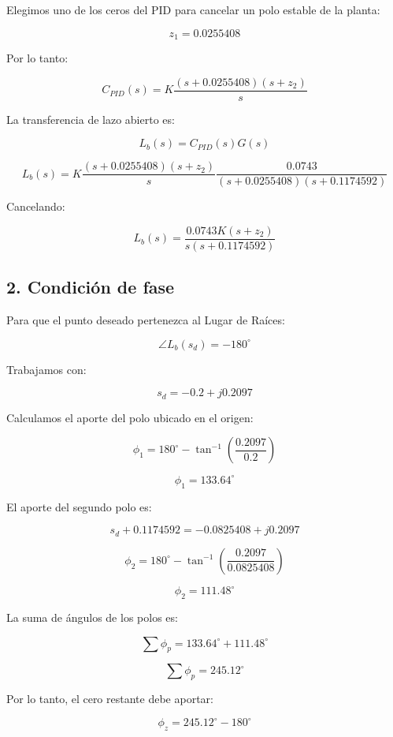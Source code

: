 \documentclass[10pt]{article}
\begin{document}
Elegimos uno de los ceros del PID para
cancelar un polo estable de la planta:

\[
z_1=0.0255408
\]

Por lo tanto:

\[
C_{PID}(s)=
K\frac{(s+0.0255408)(s+z_2)}{s}
\]

La transferencia de lazo abierto es:

\[
L_b(s)=C_{PID}(s)G(s)
\]

\[
L_b(s)=
K\frac{(s+0.0255408)(s+z_2)}{s}
\frac{0.0743}
{(s+0.0255408)(s+0.1174592)}
\]

Cancelando:

\begin{equation}
\boxed{
L_b(s)=
\frac{0.0743K(s+z_2)}
{s(s+0.1174592)}
}
\end{equation}

\subsection*{2. Condición de fase}

Para que el punto deseado pertenezca
al Lugar de Raíces:

\[
\angle L_b(s_d)=-180^\circ
\]

Trabajamos con:

\[
s_d=-0.2+j0.2097
\]

Calculamos el aporte del polo
ubicado en el origen:

\[
\phi_1=
180^\circ-
\tan^{-1}
\left(\frac{0.2097}{0.2}\right)
\]

\begin{equation}
\boxed{\phi_1=133.64^\circ}
\end{equation}

El aporte del segundo polo es:

\[
s_d+0.1174592=
-0.0825408+j0.2097
\]

\[
\phi_2=
180^\circ-
\tan^{-1}
\left(
\frac{0.2097}{0.0825408}
\right)
\]

\begin{equation}
\boxed{\phi_2=111.48^\circ}
\end{equation}

La suma de ángulos de los polos es:

\[
\sum\phi_p=
133.64^\circ+111.48^\circ
\]

\[
\boxed{\sum\phi_p=245.12^\circ}
\]

Por lo tanto, el cero restante
debe aportar:

\[
\phi_z=245.12^\circ-180^\circ
\]
\end{document}
